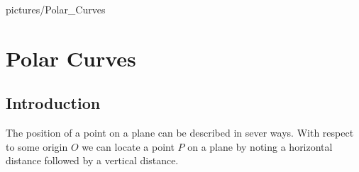 \usetikzlibrary{patterns,intersections,arrows,backgrounds}

\newcommand{\degre}{\ensuremath{^\circ}}
\pgfplotsset{compat=1.15}
\usetikzlibrary{arrows}


\newcommand{\realPlot}[2]{
	\draw[domain=#1,scale=1,samples=500 ] plot (\x:{#2}); %
}


\newenvironment{fullPlot}[4]
{\begin{center}
		\resizebox{0.5\textwidth}{!}{%
			\begin{tikzpicture}
			\begin{axis}[
			x=1cm,y=1cm,
			axis lines=middle,
			ymajorgrids=true,
			xmajorgrids=true,
			xmin=#1,
			xmax=#2,
			ymin=#3,
			ymax=#4,
			xtick={-20,-19,...,20},
			ytick={-20,-19,...,20},]
			\coordinate (origin) at (0,0);
			\end{axis}  
			\begin{scope}[shift={(origin)}]
			\clip (#1,#3) rectangle (#2,#4);
			\foreach \i in {0,15,...,75,105,120,...,180}{
				\draw[red,dashed, thick, samples=500] plot(\x, {tan(\i) * \x});}
				\draw[red, dashed, thick, samples=500] plot(0,\x);		 %
		}
	
	
		{ 			
			
			\end{scope}
			\end{tikzpicture}
		}
	\end{center}

}	



\graphicspath{pictures/Polar_Curves}

	\chapter{Polar Curves}
	\section{Introduction}
	The position of a point on a plane can be described in sever ways. With respect to some origin $O$
	we can locate a point $P$ on a plane by noting a horizontal distance followed by a vertical distance.\\
	
